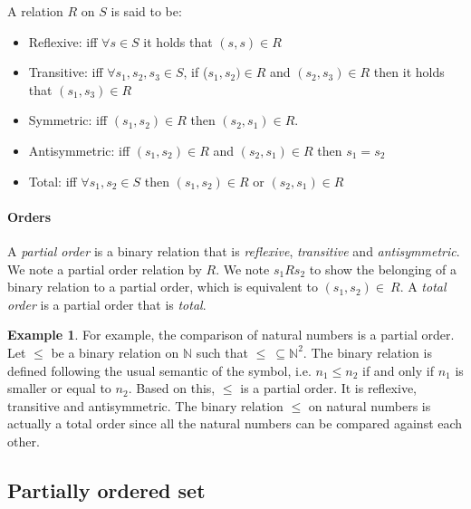 \documentclass[11pt,a4paper]{article}
\theoremstyle{definition}
\newtheorem{example}{Example}[subsection]
\begin{document}
A relation $R$ on $S$ is said to be:

\begin{itemize}
    \item Reflexive:
    iff $\forall s \in S$ it holds that $(s, s) \in R$
    \item Transitive:
    iff $\forall s_1, s_2, s_3 \in S$,
    if ($s_1, s_2) \in R$ and $(s_2, s_3) \in R$
    then it holds that $(s_1, s_3) \in R$
    \item Symmetric: iff $(s_1, s_2) \in R$ then $(s_2, s_1) \in R$.
    \item Antisymmetric: iff $(s_1, s_2) \in R$
    and $(s_2, s_1) \in R$ then $s_1 = s_2$
    \item Total: iff $\forall s_1, s_2 \in S$ then $(s_1, s_2) \in R$
    or $(s_2, s_1) \in R$

\end{itemize}

\paragraph{Orders}

A \textit{partial order} is a binary relation that is \textit{reflexive},
\textit{transitive} and \textit{antisymmetric}. We note a
partial order relation by $R$.
We note $s_1 R  s_2$ to show the belonging of
a binary relation to a partial order, which is equivalent
to $(s_1, s_2) \in \ R$.
A \textit{total order} is a partial order that is \textit{total}.

\begin{example}

For example, the comparison of natural numbers is a partial order.
Let $\leq$ be a binary relation on $\mathbb{N}$
such that $\leq \ \subseteq \mathbb{N}^2$. The binary relation is defined
following the usual semantic of the symbol, i.e. $n_1 \leq n_2$ if and
only if $n_1$ is smaller or equal to $n_2$.
Based on this, $\leq$ is a partial order. It is
reflexive, transitive and antisymmetric.
The binary relation $\leq$ on natural numbers is actually a total
order since all the natural numbers can be compared against each other.

\end{example}

\subsection{Partially ordered set}

\paragraph{}
\end{document}
